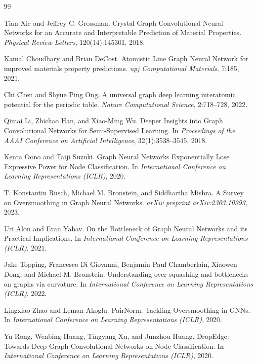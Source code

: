 \documentclass[a4paper,11pt]{article}
\begin{document}
\begin{thebibliography}{99}

Tian Xie and Jeffrey C. Grossman.
\newblock Crystal Graph Convolutional Neural Networks for an Accurate and Interpretable Prediction of Material Properties.
\newblock \emph{Physical Review Letters}, 120(14):145301, 2018.

Kamal Choudhary and Brian DeCost.
\newblock Atomistic Line Graph Neural Network for improved materials property predictions.
\newblock \emph{npj Computational Materials}, 7:185, 2021.

Chi Chen and Shyue Ping Ong.
\newblock A universal graph deep learning interatomic potential for the periodic table.
\newblock \emph{Nature Computational Science}, 2:718--728, 2022.

Qimai Li, Zhichao Han, and Xiao-Ming Wu.
\newblock Deeper Insights into Graph Convolutional Networks for Semi-Supervised Learning.
\newblock In \emph{Proceedings of the AAAI Conference on Artificial Intelligence}, 32(1):3538--3545, 2018.

Kenta Oono and Taiji Suzuki.
\newblock Graph Neural Networks Exponentially Lose Expressive Power for Node Classification.
\newblock In \emph{International Conference on Learning Representations (ICLR)}, 2020.

T. Konstantin Rusch, Michael M. Bronstein, and Siddhartha Mishra.
\newblock A Survey on Oversmoothing in Graph Neural Networks.
\newblock \emph{arXiv preprint arXiv:2303.10993}, 2023.

Uri Alon and Eran Yahav.
\newblock On the Bottleneck of Graph Neural Networks and its Practical Implications.
\newblock In \emph{International Conference on Learning Representations (ICLR)}, 2021.

Jake Topping, Francesco Di Giovanni, Benjamin Paul Chamberlain, Xiaowen Dong, and Michael M. Bronstein.
\newblock Understanding over-squashing and bottlenecks on graphs via curvature.
\newblock In \emph{International Conference on Learning Representations (ICLR)}, 2022.

Lingxiao Zhao and Leman Akoglu.
\newblock PairNorm: Tackling Oversmoothing in GNNs.
\newblock In \emph{International Conference on Learning Representations (ICLR)}, 2020.

Yu Rong, Wenbing Huang, Tingyang Xu, and Junzhou Huang.
\newblock DropEdge: Towards Deep Graph Convolutional Networks on Node Classification.
\newblock In \emph{International Conference on Learning Representations (ICLR)}, 2020.


\end{thebibliography}
\end{document}
